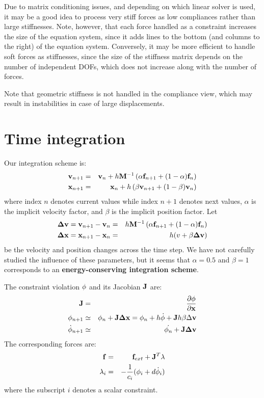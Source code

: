 Due to matrix conditioning issues, and depending on which linear solver is used, it may be a good idea to process very stiff forces as low compliances rather than large stiffnesses. Note, however, that each force handled as a constraint increases the size of the equation system, since it adds lines to the bottom (and columns to the right) of the equation system.
Conversely, it may be more efficient to handle soft forces as stiffnesses, since the size of the stiffness matrix depends on the number of independent DOFs, which does not increase along with the number of forces.

Note that geometric stiffness is not handled in the compliance view, which may result in instabilities in case of large displacements.


\section{Time integration} \label{sec:time integration}
Our integration scheme is:
\begin{eqnarray}
 \mathbf{v}_{n+1} &=& \mathbf{v}_{n} + h \mathbf{M}^{-1} \left(\alpha \mathbf{f}_{n+1} + (1-\alpha) \mathbf{f}_{n}\right) \\
  \mathbf{x}_{n+1} &=& \mathbf{x}_{n} + h \left( \beta \mathbf{v}_{n+1} + (1-\beta) \mathbf{v}_{n} \right)
\end{eqnarray}
where index $n$ denotes current values while index $n+1$ denotes next values, $\alpha$ is the implicit velocity factor, and $\beta$ is the implicit position factor. Let
\begin{eqnarray}
 \mathbf{\Delta v} = \mathbf{v}_{n+1} -    \mathbf{v}_{n}  &=& h \mathbf{M}^{-1} \left(\alpha \mathbf{f}_{n+1} + (1-\alpha) \mathbf{f}_{n}\right) \\
\mathbf{\Delta x} = \mathbf{x}_{n+1} -  \mathbf{x}_{n}    &=& h (v + \beta  \mathbf{\Delta v})
\end{eqnarray}
be the velocity and position changes across the time step.
We have not carefully studied the influence of these parameters, but it seems that $\alpha=0.5$ and $\beta=1$ corresponds to an \textbf{energy-conserving integration scheme}.


The constraint violation $\phi$ and its Jacobian $\mathbf{J}$ are:
\begin{eqnarray}
 \mathbf{J} &=& \frac{\partial \mathbf{\phi}}{\partial \mathbf{x}} \\
 \phi_{n+1} &\simeq& \phi_{n} + \mathbf{J} \mathbf{\Delta x} = \phi_{n} + h   \dot {\phi} + \mathbf{J} h \beta \Delta \mathbf{v}  \label{eq violnext}\\
\dot {\phi}_{n+1} &\simeq& \dot {\phi_{n}} + \mathbf{J} \mathbf{\Delta v} \label{eq dviolnext}
\end{eqnarray}
The corresponding forces are:
\begin{eqnarray}
 \mathbf{f} &=& \mathbf{f}_{ext} + \mathbf{J}^T \mathbf{\lambda} \\
 \mathbf{\lambda}_i &=& -\frac{1}{c_i} (  \phi_i + d \dot {\phi}_i ) \label{eq lambda}
\end{eqnarray}
where the subscript $i$ denotes a scalar constraint.

